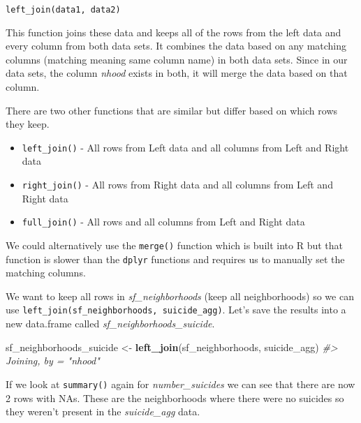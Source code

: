 \documentclass[
  12pt,
]{book}
\newenvironment{Shaded}{\begin{snugshade}}{\end{snugshade}}
\newcommand{\CommentTok}[1]{\textcolor[rgb]{0.37,0.37,0.37}{\textit{#1}}}
\newcommand{\KeywordTok}[1]{\textcolor[rgb]{0.27,0.27,0.27}{\textbf{#1}}}
\newcommand{\NormalTok}[1]{#1}
\newcommand{\OperatorTok}[1]{\textcolor[rgb]{0.43,0.43,0.43}{\textbf{#1}}}
\newcommand{\StringTok}[1]{\textcolor[rgb]{0.5,0.5,0.5}{#1}}
\providecommand{\tightlist}{%
  \setlength{\itemsep}{0pt}\setlength{\parskip}{0pt}}
\begin{document}
\texttt{left\_join(data1,\ data2)}

This function joins these data and keeps all of the rows from the left data and every column from both data sets. It combines the data based on any matching columns (matching meaning same column name) in both data sets. Since in our data sets, the column \emph{nhood} exists in both, it will merge the data based on that column.

There are two other functions that are similar but differ based on which rows they keep.

\begin{itemize}
\tightlist
\item
  \texttt{left\_join()} - All rows from Left data and all columns from Left and Right data
\item
  \texttt{right\_join()} - All rows from Right data and all columns from Left and Right data
\item
  \texttt{full\_join()} - All rows and all columns from Left and Right data
\end{itemize}

We could alternatively use the \texttt{merge()} function which is built into R but that function is slower than the \texttt{dplyr} functions and requires us to manually set the matching columns.

We want to keep all rows in \emph{sf\_neighborhoods} (keep all neighborhoods) so we can use \texttt{left\_join(sf\_neighborhoods,\ suicide\_agg)}. Let's save the results into a new data.frame called \emph{sf\_neighborhoods\_suicide}.

\begin{Shaded}
\begin{Highlighting}[]
\NormalTok{sf\_neighborhoods\_suicide <{-}}\StringTok{ }\KeywordTok{left\_join}\NormalTok{(sf\_neighborhoods, suicide\_agg)}
\CommentTok{\#> Joining, by = "nhood"}
\end{Highlighting}
\end{Shaded}

If we look at \texttt{summary()} again for \emph{number\_suicides} we can see that there are now 2 rows with NAs. These are the neighborhoods where there were no suicides so they weren't present in the \emph{suicide\_agg} data.

\begin{Shaded}
\end{Shaded}
\end{document}
